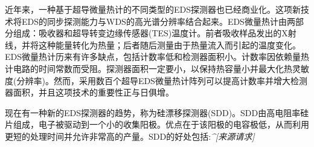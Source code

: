 近年来，一种基于超导微量热计的不同类型的EDS探测器也已经商业化。这项新技术将EDS的同步探测能力与WDS的高光谱分辨率结合起来。EDS微量热计由两部分组成：吸收器和超导转变边缘传感器(TES)温度计。前者吸收样品发出的X射线，并将这种能量转化为热量；后者随后测量由于热量流入而引起的温度变化。EDS微量热计历来有许多缺点，包括计数率低和检测器面积小。计数率因依赖量热计电路的时间常数而受阻。探测器面积一定要小，以保持热容量小并最大化热灵敏度(分辨率)。然而，采用数百个超导EDS微量热计阵列可以提高计数率并增大检测器面积，并且这项技术的重要性正与日俱增。

现在有一种新的EDS探测器的趋势，称为硅漂移探测器(SDD)。SDD由高电阻率硅片组成，电子被驱动到一个小的收集阳极。优点在于该阳极的电容极低，从而利用更短的处理时间并允许非常高的产量。SDD的好处包括:\textsl{^[来源请求]
}
